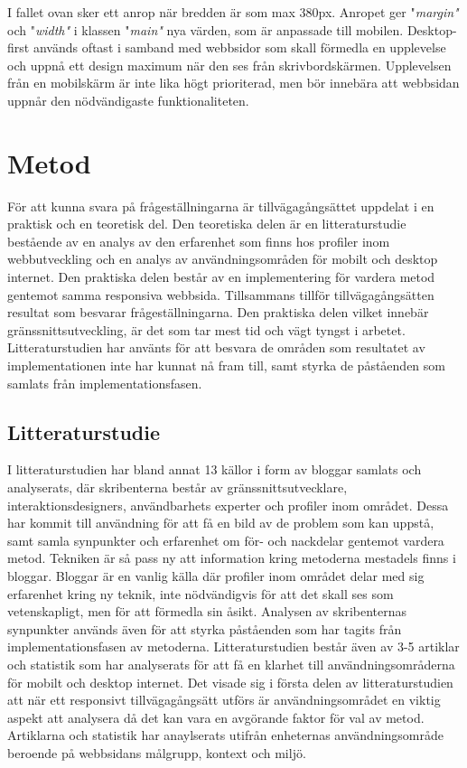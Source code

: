 \documentclass[11pt]{article}
\begin{document}
I fallet ovan sker ett anrop när bredden är som max 380px. Anropet ger "\textit{margin"} och "\textit{width"} i klassen "\textit{main"} nya värden, som är anpassade till mobilen. Desktop-first används oftast i samband med webbsidor som skall förmedla en upplevelse och uppnå ett design maximum när den ses från skrivbordskärmen. Upplevelsen från en mobilskärm är inte lika högt prioriterad, men bör innebära att webbsidan uppnår den nödvändigaste funktionaliteten.
\newpage

\section{Metod}
För att kunna svara på frågeställningarna är tillvägagångsättet uppdelat i en praktisk och en teoretisk del. Den teoretiska delen är en litteraturstudie bestående av en analys av den erfarenhet som finns hos profiler inom webbutveckling och en analys av användningsområden för mobilt och desktop internet. Den praktiska delen består av en implementering för vardera metod gentemot samma responsiva webbsida. Tillsammans tillför tillvägagångsätten resultat som besvarar frågeställningarna. Den praktiska delen vilket innebär gränssnittsutveckling, är det som tar mest tid och vägt tyngst i arbetet. Litteraturstudien har använts för att besvara de områden som resultatet av implementationen inte har kunnat nå fram till, samt styrka de påståenden som samlats från implementationsfasen.


\subsection{Litteraturstudie}
I litteraturstudien har bland annat 13 källor i form av bloggar samlats och analyserats, där skribenterna består av gränssnittsutvecklare, interaktionsdesigners, användbarhets experter och profiler inom området. Dessa har kommit till användning för att få en bild av de problem som kan uppstå, samt samla synpunkter och erfarenhet om för- och nackdelar gentemot vardera metod. Tekniken är så pass ny att information kring metoderna mestadels finns i bloggar. Bloggar är en vanlig källa där profiler inom området delar med sig erfarenhet kring ny teknik, inte nödvändigvis för att det skall ses som vetenskapligt, men för att förmedla sin åsikt. Analysen av skribenternas synpunkter används även för att styrka påståenden som har tagits från implementationsfasen av metoderna. Litteraturstudien består även av 3-5 artiklar och statistik som har analyserats för att få en klarhet till användningsområderna för mobilt och desktop internet. Det visade sig i första delen av litteraturstudien att när ett responsivt tillvägagångsätt utförs är användningsområdet en viktig aspekt att analysera då det kan vara en avgörande faktor för val av metod. Artiklarna och statistik har anaylserats utifrån enheternas användningsområde beroende på webbsidans målgrupp, kontext och miljö.
\end{document}
